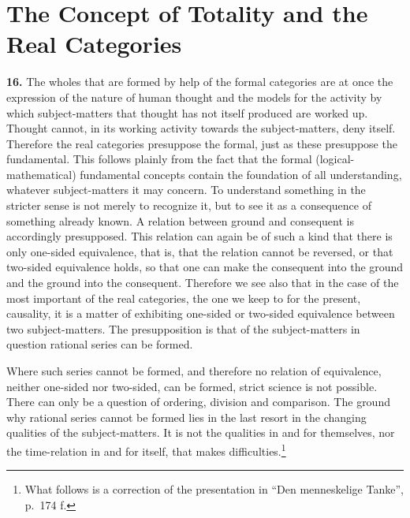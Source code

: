 \documentclass[12pt]{book}
\newcommand{\hnum}[1]{\textbf{#1.}\enspace}
\newcommand{\opage}[1]{\marginnote{\footnotesize\textit{[#1]}}}
\begin{document}

\chapter{The Concept of Totality and the Real Categories}
\label{ch:4}

\hnum{16} The wholes that are formed by help of the formal categories are at once
the expression of the nature of human thought and the models for the activity by
which subject-matters that thought has not itself produced are worked up. Thought
cannot, in its working activity towards the subject-matters, deny itself.
Therefore the real categories presuppose the formal, just as these presuppose the
fundamental. This follows plainly from the fact that the formal
(logical-mathematical) fundamental concepts contain the foundation of all
understanding, whatever subject-matters it may concern. To understand something
in the stricter sense is not merely to recognize it, but to see it as a
consequence of something already known. A relation between ground and consequent
is accordingly presupposed. This relation can again be of such a kind that there
is only one-sided equivalence, that is, that the relation cannot be reversed, or
that two-sided equivalence holds, so that one can make the consequent into the
ground and the ground into the consequent. Therefore we see also that in the case
of the most important of the real categories, the one we keep \opage{43}to for the present,
causality, it is a matter of exhibiting one-sided or two-sided equivalence between
two subject-matters. The presupposition is that of the subject-matters in question
rational series can be formed.

Where such series cannot be formed, and therefore no relation of equivalence,
neither one-sided nor two-sided, can be formed, strict science is not possible.
There can only be a question of ordering, division and comparison. The ground why
rational series cannot be formed lies in the last resort in the changing qualities
of the subject-matters. It is not the qualities in and for themselves, nor the
time-relation in and for itself, that makes
difficulties.\footnote{What follows is a correction of the presentation in ``Den
menneskelige Tanke'', p.\ 174 f.}
\end{document}
